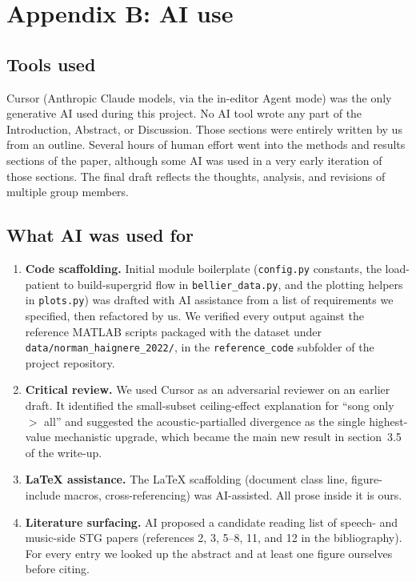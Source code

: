 \documentclass[11pt]{article}
\begin{document}
\section*{Appendix B: AI use}

\subsection*{Tools used}
Cursor (Anthropic Claude models, via the in-editor Agent mode) was the only generative AI used during this project. No AI tool wrote any part of the Introduction, Abstract, or Discussion. Those sections were entirely written by us from an outline. Several hours of human effort went into the methods and results sections of the paper, although some AI was used in a very early iteration of those sections. The final draft reflects the thoughts, analysis, and revisions of multiple group members.

\subsection*{What AI was used for}
\begin{enumerate}
  \item \textbf{Code scaffolding.} Initial module boilerplate (\texttt{config.py} constants, the load-patient to build-supergrid flow in \texttt{bellier\_data.py}, and the plotting helpers in \texttt{plots.py}) was drafted with AI assistance from a list of requirements we specified, then refactored by us. We verified every output against the reference MATLAB scripts packaged with the dataset under \texttt{data/norman\_haignere\_2022/}, in the \texttt{reference\_code} subfolder of the project repository.

  \item \textbf{Critical review.} We used Cursor as an adversarial reviewer on an earlier draft. It identified the small-subset ceiling-effect explanation for ``song only $>$ all'' and suggested the acoustic-partialled divergence as the single highest-value mechanistic upgrade, which became the main new result in section~3.5 of the write-up.

  \item \textbf{\LaTeX{} assistance.} The \LaTeX{} scaffolding (document class line, figure-include macros, cross-referencing) was AI-assisted. All prose inside it is ours.

  \item \textbf{Literature surfacing.} AI proposed a candidate reading list of speech- and music-side STG papers (references 2, 3, 5--8, 11, and 12 in the bibliography). For every entry we looked up the abstract and at least one figure ourselves before citing.
\end{enumerate}
\end{document}

